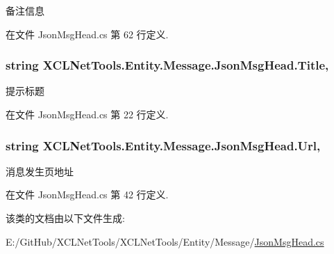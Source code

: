 备注信息 



在文件 Json\+Msg\+Head.\+cs 第 62 行定义.

\subsubsection[{\texorpdfstring{Title}{Title}}]{\setlength{\rightskip}{0pt plus 5cm}string X\+C\+L\+Net\+Tools.\+Entity.\+Message.\+Json\+Msg\+Head.\+Title\hspace{0.3cm}{\ttfamily [get]}, {\ttfamily [set]}}\hypertarget{class_x_c_l_net_tools_1_1_entity_1_1_message_1_1_json_msg_head_adb0f08c4bef6b6cfe41e6c20eb1e7762}{}\label{class_x_c_l_net_tools_1_1_entity_1_1_message_1_1_json_msg_head_adb0f08c4bef6b6cfe41e6c20eb1e7762}


提示标题 



在文件 Json\+Msg\+Head.\+cs 第 22 行定义.

\subsubsection[{\texorpdfstring{Url}{Url}}]{\setlength{\rightskip}{0pt plus 5cm}string X\+C\+L\+Net\+Tools.\+Entity.\+Message.\+Json\+Msg\+Head.\+Url\hspace{0.3cm}{\ttfamily [get]}, {\ttfamily [set]}}\hypertarget{class_x_c_l_net_tools_1_1_entity_1_1_message_1_1_json_msg_head_a30c01b95d9a0854dec4af920541f3320}{}\label{class_x_c_l_net_tools_1_1_entity_1_1_message_1_1_json_msg_head_a30c01b95d9a0854dec4af920541f3320}


消息发生页地址 



在文件 Json\+Msg\+Head.\+cs 第 42 行定义.



该类的文档由以下文件生成\+:\begin{DoxyCompactItemize}
\item 
E\+:/\+Git\+Hub/\+X\+C\+L\+Net\+Tools/\+X\+C\+L\+Net\+Tools/\+Entity/\+Message/\hyperlink{_json_msg_head_8cs}{Json\+Msg\+Head.\+cs}\end{DoxyCompactItemize}
